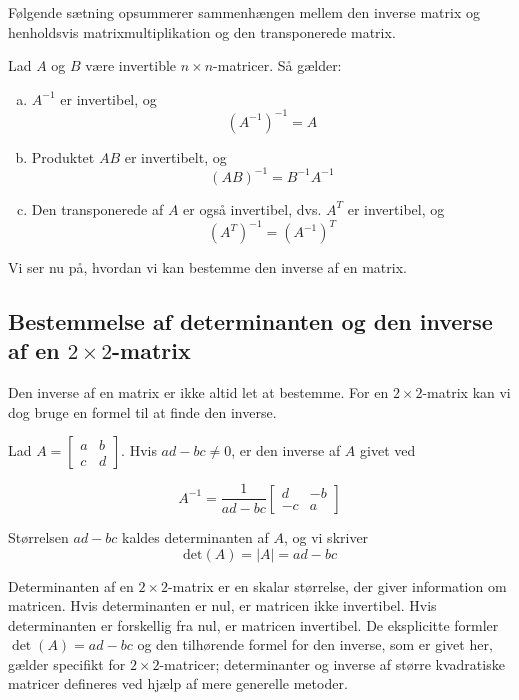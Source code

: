 Følgende sætning opsummerer sammenhængen mellem den inverse matrix og henholdsvis matrixmultiplikation og den transponerede matrix.

\begin{theorem} Lad $A$ og $B$ være invertible $n \times n$-matricer. Så gælder:
\begin{enumerate}[(a)]
    \item $A^{-1}$ er invertibel, og
    \[
    \left(A^{-1}\right)^{-1}=A
    \]
    \item Produktet $A B$ er invertibelt, og
    \[
    (A B)^{-1}=B^{-1} A^{-1}
    \]
    \item Den transponerede af $A$ er også invertibel, dvs. $A^T$ er invertibel, og
    \[
    \left(A^T\right)^{-1}=\left(A^{-1}\right)^T
    \]
\end{enumerate}

\end{theorem}

Vi ser nu på, hvordan vi kan bestemme den inverse af en matrix.

\subsection*{Bestemmelse af determinanten og den inverse af en $2 \times 2$-matrix}

Den inverse af en matrix er ikke altid let at bestemme. For en $2 \times 2$-matrix kan vi dog bruge en formel til at finde den inverse.

\begin{theorem}
    Lad $A=\left[\begin{array}{ll}
    a & b \\
    c & d
    \end{array}\right]$. Hvis $ad-bc \neq 0$, er den inverse af $A$ givet ved

    \[
    A^{-1}=\frac{1}{ad-bc}\left[\begin{array}{cc}
    d & -b \\
    -c & a
    \end{array}\right]
    \]
\end{theorem}

\begin{remark}
    Størrelsen $ad - bc$ kaldes determinanten af $A$, og vi skriver
    \[
    \text{det}(A) = |A| = ad - bc
    \]
\end{remark}

Determinanten af en $2 \times 2$-matrix er en skalar størrelse, der giver information om matricen. Hvis determinanten er nul, er matricen ikke invertibel. Hvis determinanten er forskellig fra nul, er matricen invertibel. De eksplicitte formler $\det(A)=ad-bc$ og den tilhørende formel for den inverse, som er givet her, gælder specifikt for $2\times2$-matricer; determinanter og inverse af større kvadratiske matricer defineres ved hjælp af mere generelle metoder.

